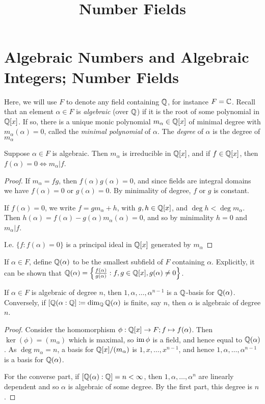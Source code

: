 \documentclass[10pt,a4paper]{article}
\title{Number Fields}
\begin{document}
\maketitle

\section{Algebraic Numbers and Algebraic Integers; Number Fields}
Here, we will use $F$ to denote any field containing $\mathbb{Q}$, for instance $F = \mathbb{C}$. Recall that an element $\alpha \in F$ is \emph{algebraic} (over $\mathbb{Q}$) if it is the root of some polynomial in $\mathbb{Q}[x]$. If so, there is a unique monic polynomial $m_{\alpha} \in \mathbb{Q}[x]$ of minimal degree with $m_{\alpha}(\alpha) = 0$, called the \emph{minimal polynomial} of $\alpha$. The \emph{degree} of $\alpha$ is the degree of $m_{\alpha}$

\begin{proposition}
Suppose $\alpha \in F$ is algebraic. Then $m_{\alpha}$ is irreducible in $\mathbb{Q}[x]$, and if $f \in \mathbb{Q}[x]$, then $f(\alpha) = 0 \iff m_{\alpha} | f$.
\end{proposition}
\begin{proof}
If $m_{\alpha} = fg$, then $f(\alpha)g(\alpha) = 0$, and since fields are integral domains we have $f(\alpha) = 0$ or $g(\alpha) = 0$. By minimality of degree, $f$ or $g$ is constant.

If $f(\alpha) = 0$, we write $f = gm_{\alpha} + h$, with $g, h \in \mathbb{Q}[x]$, and $\deg h < \deg m_{\alpha}$. Then $h(\alpha) = f(\alpha) - g(\alpha)m_{\alpha}(\alpha) = 0$, and so by minimality $h = 0$ and $m_{\alpha}|f$.

I.e. $\{f : f(\alpha) = 0\}$ is a principal ideal in $\mathbb{Q}[x]$ generated by $m_{\alpha}$
\end{proof}

If $\alpha \in F$, define $\mathbb{Q}(\alpha)$ to be the smallest subfield of $F$ containing $\alpha$. Explicitly, it can be shown that $\mathbb{Q}(\alpha) = \left\{ \frac{f(\alpha)}{g(\alpha)} : f, g \in \mathbb{Q}[x], g(\alpha) \neq 0\right\}$.

\begin{proposition}
If $\alpha \in F$ is algebraic of degree $n$, then $1, \alpha, \ldots, \alpha^{n-1}$ is a $\mathbb{Q}$-basis for $\mathbb{Q}(\alpha)$. Conversely, if $[\mathbb{Q}(\alpha: \mathbb{Q}] \coloneqq \dim_{\mathbb{Q}} \mathbb{Q}(\alpha)$ is finite, say $n$, then $\alpha$ is algebraic of degree $n$.
\end{proposition}
\begin{proof}
Consider the homomorphism $\phi:\mathbb{Q}[x] \to F; f\mapsto f(\alpha)$. Then $\ker(\phi) = (m_\alpha)$ which is maximal, so $\operatorname{im} \phi$ is a field, and hence equal to $\mathbb{Q}(\alpha)$. As $\deg m_{\alpha} = n$, a basis for $\mathbb{Q}[x]/(m_\alpha)$ is $1, x, \ldots, x^{n-1}$, and hence $1, \alpha, \ldots, \alpha^{n-1}$ is a basis for $\mathbb{Q}(\alpha)$.

For the converse part, if $[\mathbb{Q}(\alpha):\mathbb{Q}] = n < \infty$, then $1, \alpha, \ldots, \alpha^n$ are linearly dependent and so $\alpha$ is algebraic of some degree. By the first part, this degree is $n$.
\end{proof}
\end{document}
